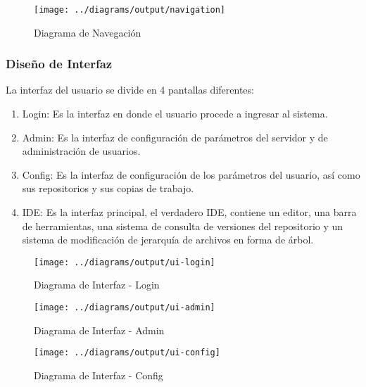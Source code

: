 \begin{landscape}
\begin{figure}
 \centering
 \texttt{[image: ../diagrams/output/navigation]}
 \caption{Diagrama de Navegación}
 \label{diagrama:navegación}
\end{figure}
\end{landscape}


\subsubsection{Diseño de Interfaz}

La interfaz del usuario se divide en 4 pantallas diferentes:

\begin{enumerate}

	\item Login: Es la interfaz en donde el usuario procede a ingresar al sistema.
	
	\item Admin: Es la interfaz de configuración de parámetros del servidor y de administración de usuarios.
	
	\item Config: Es la interfaz de configuración de los parámetros del usuario, así como sus repositorios y sus copias de trabajo.
	
	\item IDE: Es la interfaz principal, el verdadero IDE, contiene un editor, una barra de herramientas, una sistema de consulta de versiones del repositorio y un sistema de modificación de jerarquía de archivos en forma de árbol.

\end{enumerate}

\begin{landscape}
\begin{figure}
 \centering
 \texttt{[image: ../diagrams/output/ui-login]}
 \caption{Diagrama de Interfaz - Login}
 \label{diagrama:ui-login}
\end{figure}
\end{landscape}

\begin{figure}
 \centering
 \texttt{[image: ../diagrams/output/ui-admin]}
 \caption{Diagrama de Interfaz - Admin}
 \label{diagrama:ui-admin}
\end{figure}

\begin{figure}
 \centering
 \texttt{[image: ../diagrams/output/ui-config]}
 \caption{Diagrama de Interfaz - Config}
 \label{diagrama:ui-config}
\end{figure}

